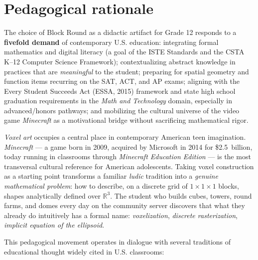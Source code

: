\documentclass[12pt,a4paper]{scrartcl}
\newcommand{\acc}[1]{\textcolor{accent}{\textbf{#1}}}
\begin{document}
\section{Pedagogical rationale}\label{sec:rationale}

The choice of Block Round as a didactic artifact for Grade 12 responds to a \acc{fivefold demand} of contemporary U.S. education: integrating formal mathematics and digital literacy (a goal of the ISTE Standards and the CSTA K--12 Computer Science Framework); contextualizing abstract knowledge in practices that are \emph{meaningful} to the student; preparing for spatial geometry and function items recurring on the SAT, ACT, and AP exams; aligning with the Every Student Succeeds Act (ESSA, 2015) framework and state high school graduation requirements in the \emph{Math and Technology} domain, especially in advanced/honors pathways; and mobilizing the cultural universe of the video game \emph{Minecraft} as a motivational bridge without sacrificing mathematical rigor.

\emph{Voxel art} occupies a central place in contemporary American teen imagination. \emph{Minecraft} --- a game born in 2009, acquired by Microsoft in 2014 for \$2.5~billion, today running in classrooms through \emph{Minecraft Education Edition} --- is the most transversal cultural reference for American adolescents. Taking voxel construction as a starting point transforms a familiar \emph{ludic} tradition into a \emph{genuine mathematical problem}: how to describe, on a discrete grid of $1\times1\times1$ blocks, shapes analytically defined over $\mathbb{R}^3$. The student who builds cubes, towers, round farms, and domes every day on the community server discovers that what they already do intuitively has a formal name: \emph{voxelization}, \emph{discrete rasterization}, \emph{implicit equation of the ellipsoid}.

This pedagogical movement operates in dialogue with several traditions of educational thought widely cited in U.S. classrooms:
\end{document}
